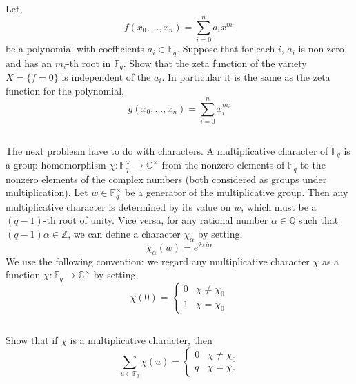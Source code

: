 \documentclass[12pt]{article}
\newcommand{\ZZ}{\mathbb{Z}}
\newcommand{\QQ}{\mathbb{Q}}
\newcommand{\FF}{\mathbb{F}}
\newcommand{\CC}{\mathbb{C}}
\theoremstyle{remark}
\theoremstyle{definition}
\begin{document}
\subsection{}

Let,
\[ f(x_0, \dots, x_n) = \sum_{i = 0}^n a_i x^{m_i} \]
be a polynomial with coefficients $a_i \in \FF_q$. Suppose that for each $i$, $a_i$ is non-zero and has an $m_i$-th root in $\FF_q$. Show that the zeta function of the variety $X = \{ f = 0 \}$ is independent of the $a_i$. In particular it is the same as the zeta function for the polynomial,
\[ g(x_0, \dots, x_n) = \sum_{i = 0}^n x_i^{m_i} \]

\subsection{}

The next problesm have to do with characters. A multiplicative character of $\FF_q$ is a group homomorphism $\chi : \FF_q^\times \to \CC^\times$ from the nonzero elements of $\FF_q$ to the nonzero elements of the complex numbers (both considered as groups under multiplication). Let $w \in \FF_q^\times$ be a generator of the multiplicative group. Then any multiplicative character is determined by its value on $w$, which must be a $(q-1)$-th root of unity. Vice versa, for any rational number $\alpha \in \QQ$ such that $(q-1) \alpha \in \ZZ$, we can define a character $\chi_\alpha$ by setting,
\[ \chi_\alpha(w) = e^{2 \pi i \alpha} \]
We use the following convention: we regard any multiplicative character $\chi$ as a function $\chi : \FF_q \to \CC^\times$ by setting,
\[ \chi(0) = 
\begin{cases}
0 & \chi \neq \chi_0
\\
1 & \chi = \chi_0 
\end{cases} \]

\subsection{}

Show that if $\chi$ is a multiplicative character, then
\[ \sum_{u \in \FF_q} \chi(u) = 
\begin{cases}
0 & \chi \neq \chi_0
\\
q & \chi = \chi_0 
\end{cases} \]

\subsection{}
\end{document}
